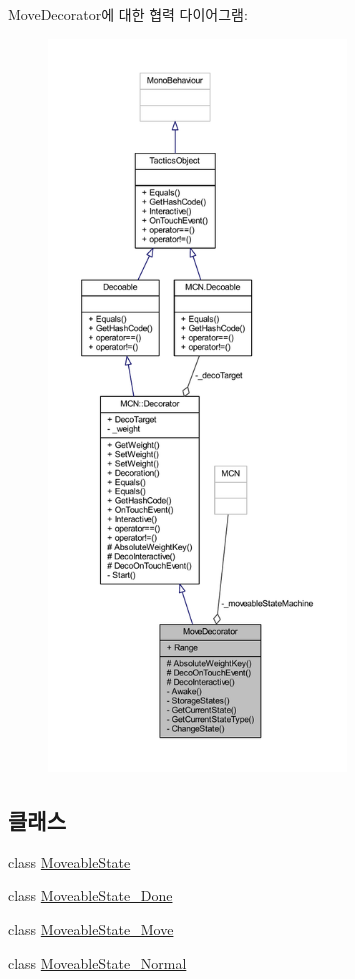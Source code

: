 Move\+Decorator에 대한 협력 다이어그램\+:
\nopagebreak
\begin{figure}[H]
\begin{center}
\leavevmode
\includegraphics[height=550pt]{class_move_decorator__coll__graph}
\end{center}
\end{figure}
\subsection*{클래스}
\begin{DoxyCompactItemize}
\item 
class \hyperlink{class_move_decorator_1_1_moveable_state}{Moveable\+State}
\item 
class \hyperlink{class_move_decorator_1_1_moveable_state___done}{Moveable\+State\+\_\+\+Done}
\item 
class \hyperlink{class_move_decorator_1_1_moveable_state___move}{Moveable\+State\+\_\+\+Move}
\item 
class \hyperlink{class_move_decorator_1_1_moveable_state___normal}{Moveable\+State\+\_\+\+Normal}
\end{DoxyCompactItemize}
